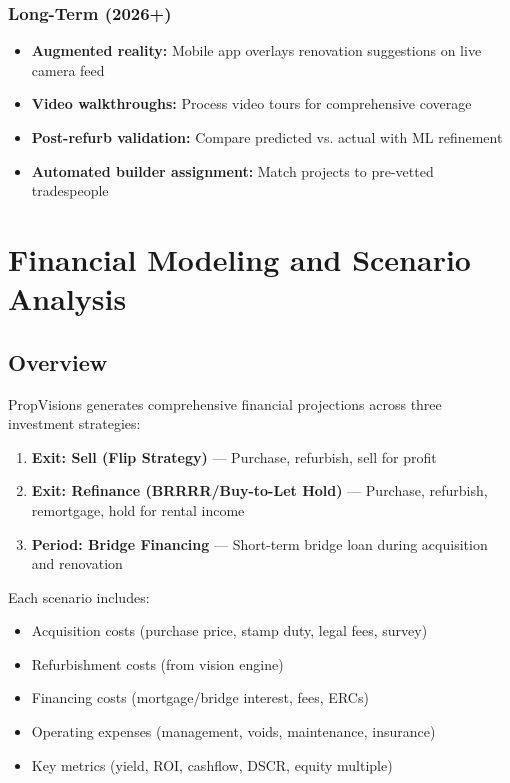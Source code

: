 \documentclass[11pt,a4paper]{article}
\begin{document}
\subsubsection{Long-Term (2026+)}
\begin{itemize}
  \item \textbf{Augmented reality:} Mobile app overlays renovation suggestions on live camera feed
  \item \textbf{Video walkthroughs:} Process video tours for comprehensive coverage
  \item \textbf{Post-refurb validation:} Compare predicted vs. actual with ML refinement
  \item \textbf{Automated builder assignment:} Match projects to pre-vetted tradespeople
\end{itemize}

\section{Financial Modeling and Scenario Analysis}

\subsection{Overview}

PropVisions generates comprehensive financial projections across three investment strategies:

\begin{enumerate}
  \item \textbf{Exit: Sell (Flip Strategy)} — Purchase, refurbish, sell for profit
  \item \textbf{Exit: Refinance (BRRRR/Buy-to-Let Hold)} — Purchase, refurbish, remortgage, hold for rental income
  \item \textbf{Period: Bridge Financing} — Short-term bridge loan during acquisition and renovation
\end{enumerate}

Each scenario includes:
\begin{itemize}
  \item Acquisition costs (purchase price, stamp duty, legal fees, survey)
  \item Refurbishment costs (from vision engine)
  \item Financing costs (mortgage/bridge interest, fees, ERCs)
  \item Operating expenses (management, voids, maintenance, insurance)
  \item Key metrics (yield, ROI, cashflow, DSCR, equity multiple)
\end{itemize}
\end{document}

